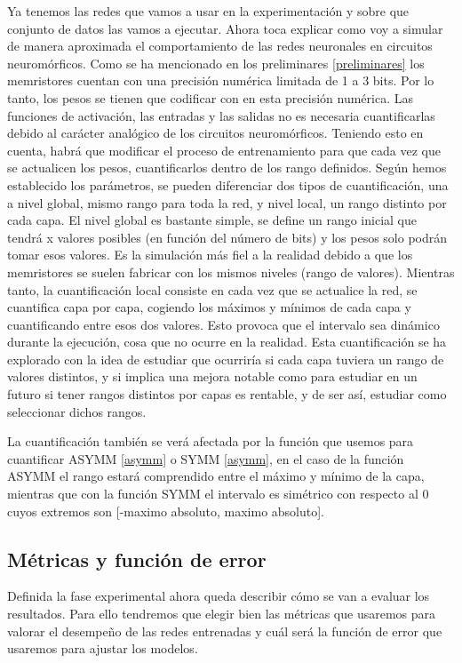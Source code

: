 Ya tenemos las redes que vamos a usar en la experimentación y sobre que conjunto de datos las vamos a ejecutar. Ahora toca explicar como voy a simular de manera aproximada el comportamiento de las redes neuronales en circuitos neuromórficos. Como se ha mencionado en los preliminares \ref{preliminares} los memristores cuentan con una precisión numérica limitada de 1 a 3 bits. Por lo tanto, los pesos se tienen que codificar con en esta precisión numérica. Las funciones de activación, las entradas y las salidas no es necesaria cuantificarlas debido al carácter analógico de los circuitos neuromórficos. Teniendo esto en cuenta, habrá que modificar el proceso de entrenamiento para que cada vez que se actualicen los pesos, cuantificarlos dentro de los rango definidos. Según hemos establecido los parámetros, se pueden diferenciar dos tipos de cuantificación, una a nivel global, mismo rango para toda la red, y nivel local, un rango distinto por cada capa. El nivel global es bastante simple, se define un rango inicial que tendrá x valores posibles (en función del número de bits) y los pesos solo podrán tomar esos valores. Es la simulación más fiel a la realidad debido a que los memristores se suelen fabricar con los mismos niveles (rango de valores). Mientras tanto, la cuantificación local consiste en cada vez que se actualice la red, se cuantifica capa por capa, cogiendo los máximos y mínimos de cada capa y cuantificando entre esos dos valores. Esto provoca que el intervalo sea dinámico durante la ejecución, cosa que no ocurre en la realidad. Esta cuantificación se ha explorado con la idea de estudiar que ocurriría si cada capa tuviera un rango de valores distintos, y si implica una mejora notable como para estudiar en un futuro si tener rangos distintos por capas es rentable, y de ser así, estudiar como seleccionar dichos rangos.  

La cuantificación también se verá afectada por la función que usemos para cuantificar ASYMM \ref{asymm} o SYMM \ref{asymm}, en el caso de la función ASYMM el rango estará comprendido entre el máximo y mínimo de la capa, mientras que con la función SYMM el intervalo es simétrico con respecto al 0 cuyos extremos son [-maximo absoluto, maximo absoluto].

\subsection{Métricas y función de error}

Definida la fase experimental ahora queda describir cómo se van a evaluar los resultados. Para ello tendremos que elegir bien las métricas que usaremos para valorar el desempeño de las redes entrenadas y cuál será la función de error que usaremos para ajustar los modelos.

